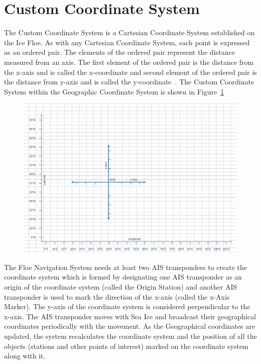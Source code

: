 \section{Custom Coordinate System}
\label{sec:sec4_3}
\noindent
%
The Custom Coordinate System is a Cartesian Coordinate System established on the Ice Floe. As with any Cartesian Coordinate System, each point is expressed as an ordered pair. The elements of the ordered pair represent the distance measured from an axis. The first element of the ordered pair is the distance from the x-axis and is called the x-coordinate and second element of the ordered pair is the distance from y-axis and is called the y-coordinate~\cite{van2010basic}. The Custom Coordinate System within the Geographic Coordinate System is shown in Figure~\ref{fig:CH4CustomCoordinate}
\begin{figure}[h]
	\centering
	\includegraphics[height=0.45\textheight]{fig04/cartesiancoordinates.png}
	\label{fig:CH4CustomCoordinate}
\end{figure}
%
\newline
\noindent
The Floe Navigation System needs at least two AIS transponders to create the coordinate system which is formed by designating one AIS transponder as an origin of the coordinate system (called the Origin Station) and another AIS transponder is used to mark the direction of the x-axis (called the x-Axis Marker). The y-axis of the coordinate system is considered perpendicular to the x-axis. The AIS transponder moves with Sea Ice and broadcast their geographical coordinates periodically with the movement. As the Geographical coordinates are updated, the system recalculates the coordinate system and the position of all the objects (stations and other points of interest) marked on the coordinate system along with it. 
%

